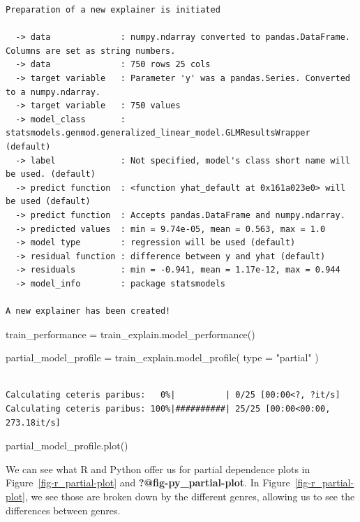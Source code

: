 \documentclass[
  letterpaper,
]{krantz}
\newenvironment{Shaded}{}{}
\newcommand{\BuiltInTok}[1]{\textcolor[rgb]{0.00,0.50,0.00}{#1}}
\newcommand{\NormalTok}[1]{#1}
\newcommand{\OperatorTok}[1]{\textcolor[rgb]{0.40,0.40,0.40}{#1}}
\newcommand{\StringTok}[1]{\textcolor[rgb]{0.25,0.44,0.63}{#1}}
\begin{document}
\begin{verbatim}
Preparation of a new explainer is initiated

  -> data              : numpy.ndarray converted to pandas.DataFrame. Columns are set as string numbers.
  -> data              : 750 rows 25 cols
  -> target variable   : Parameter 'y' was a pandas.Series. Converted to a numpy.ndarray.
  -> target variable   : 750 values
  -> model_class       : statsmodels.genmod.generalized_linear_model.GLMResultsWrapper (default)
  -> label             : Not specified, model's class short name will be used. (default)
  -> predict function  : <function yhat_default at 0x161a023e0> will be used (default)
  -> predict function  : Accepts pandas.DataFrame and numpy.ndarray.
  -> predicted values  : min = 9.74e-05, mean = 0.563, max = 1.0
  -> model type        : regression will be used (default)
  -> residual function : difference between y and yhat (default)
  -> residuals         : min = -0.941, mean = 1.17e-12, max = 0.944
  -> model_info        : package statsmodels

A new explainer has been created!
\end{verbatim}

\begin{Shaded}
\begin{Highlighting}[]
\NormalTok{train\_performance }\OperatorTok{=}\NormalTok{ train\_explain.model\_performance()}

\NormalTok{partial\_model\_profile }\OperatorTok{=}\NormalTok{ train\_explain.model\_profile(}
    \BuiltInTok{type} \OperatorTok{=} \StringTok{"partial"}
\NormalTok{)}
\end{Highlighting}
\end{Shaded}

\begin{verbatim}

Calculating ceteris paribus:   0%|          | 0/25 [00:00<?, ?it/s]
Calculating ceteris paribus: 100%|##########| 25/25 [00:00<00:00, 273.18it/s]
\end{verbatim}

\begin{Shaded}
\begin{Highlighting}[]
\NormalTok{partial\_model\_profile.plot()}
\end{Highlighting}
\end{Shaded}

We can see what R and Python offer us for partial dependence plots in
Figure~\ref{fig-r_partial-plot} and \textbf{?@fig-py\_partial-plot}. In
Figure~\ref{fig-r_partial-plot}, we see those are broken down by the
different genres, allowing us to see the differences between genres.
\end{document}
